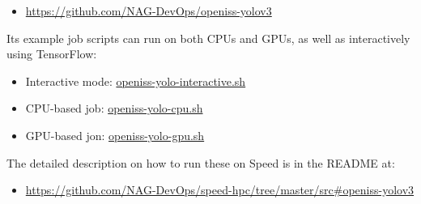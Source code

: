 \begin{itemize}
	\item \url{https://github.com/NAG-DevOps/openiss-yolov3}
\end{itemize}

Its example job scripts can run on both CPUs and GPUs,
as well as interactively using TensorFlow:

\begin{itemize}
	\item Interactive mode:
  \href{https://github.com/NAG-DevOps/speed-hpc/blob/master/src/openiss-yolo-interactive.sh}
  {openiss-yolo-interactive.sh}
	\item CPU-based job:
  \href{https://github.com/NAG-DevOps/speed-hpc/blob/master/src/openiss-yolo-cpu.sh}
  {openiss-yolo-cpu.sh}
	\item GPU-based jon:
  \href{https://github.com/NAG-DevOps/speed-hpc/blob/master/src/openiss-yolo-gpu.sh}
  {openiss-yolo-gpu.sh}
\end{itemize}

The detailed description on how to run these on Speed is
in the README at:

\begin{itemize}
	\item \url{https://github.com/NAG-DevOps/speed-hpc/tree/master/src#openiss-yolov3}
\end{itemize}

